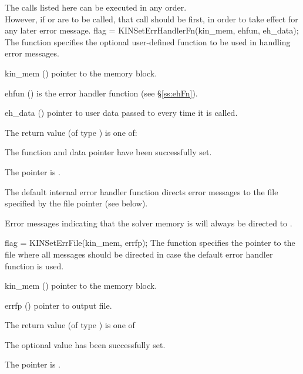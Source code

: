 The calls listed here can be executed in any order. \\
However, if  
or  are to be called, that call should be first, in order to take
effect for any later error message.
{
flag = KINSetErrHandlerFn(kin\_mem, ehfun, eh\_data);
}
{
  The function  specifies the optional user-defined function
  to be used in handling error messages.
}
{
  \begin{args}
  \item[kin\_mem] ()
    pointer to the {\kinsol} memory block.
  \item[ehfun] ()
    is the {\C} error handler function (see \S\ref{ss:ehFn}).
  \item[eh\_data] ()
    pointer to user data passed to  every time it is called.
  \end{args}
}
{
  The return value  (of type ) is one of:
  \begin{args}
  \item[\Id{KIN\_SUCCESS}] 
    The function  and data pointer  have been successfully set.
  \item[\Id{KIN\_MEM\_NULL}]
    The  pointer is .
  \end{args}
}
{
  The default internal error handler function directs error messages to the
  file specified by the file pointer  (see  below).

  Error messages indicating that the {\kinsol} solver memory is  will
  always be directed to .
}
{
flag = KINSetErrFile(kin\_mem, errfp);
}
{
  The function  specifies the pointer to the file
  where all {\kinsol} messages should be directed in case the default
  {\kinsol} error handler function is used.
}
{
  \begin{args}
  \item[kin\_mem] ()
    pointer to the {\kinsol} memory block.
  \item[errfp] ()
    pointer to output file.
  \end{args}
}
{
  The return value  (of type ) is one of
  \begin{args}
  \item[\Id{KIN\_SUCCESS}] 
    The optional value has been successfully set.
  \item[\Id{KIN\_MEM\_NULL}]
    The  pointer is .
  \end{args}
}

